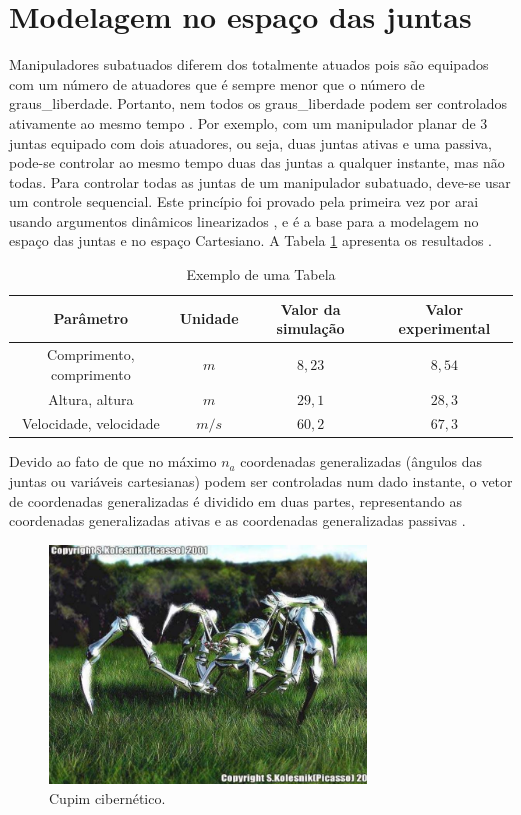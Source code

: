 \section{Modelagem no espaço das juntas}
Manipuladores subatuados diferem dos totalmente atuados pois são equipados com um número de atuadores que é sempre menor que o número de \gls{graus_liberdade}. Portanto, nem todos os \gls{graus_liberdade} podem ser controlados ativamente ao mesmo tempo \cite{Sbornian2004}. Por exemplo, com um manipulador planar de 3 juntas equipado com dois atuadores, ou seja, duas juntas ativas e
uma passiva, pode-se controlar ao mesmo tempo duas das juntas a qualquer instante, mas não todas. Para controlar todas as juntas de um manipulador subatuado, deve-se usar um controle sequencial. Este princípio foi provado pela primeira vez por {arai} usando  argumentos dinâmicos linearizados \cite{Joea2003}, e é a base para a modelagem no espaço das juntas e no espaço Cartesiano. A Tabela \ref{minhatab} apresenta os resultados \cite{Assenmacher1993,Silberschatz1991,Caromel1998}.

\begin{table}
\caption{Exemplo de uma Tabela}
\label{minhatab}

\center
\begin{tabular}{cccc}
  \hline
	Parâmetro & Unidade & Valor da simulação & Valor experimental   \\
	\hline
  Comprimento, \gls{comprimento} & $m$ &  $8,23$  & $8,54$ \\
  Altura, \gls{altura} & $m$     &  $29,1$ & $28,3$\\
	Velocidade, \gls{velocidade} & $m/s$  &  $60,2$ & $67,3$\\
	\hline
\end{tabular}
\end{table}

Devido ao fato de que no máximo $n_{a}$ coordenadas generalizadas (ângulos das juntas ou variáveis cartesianas) podem ser controladas num dado instante, o vetor de coordenadas generalizadas é dividido em duas partes, representando as coordenadas generalizadas ativas e as coordenadas generalizadas passivas \cite{Callaghan1995}.

\begin{figure}[ht]
\centering
\includegraphics[width=0.75\textwidth]{Cap2/spiderrobot}
\caption{Cupim cibernético.}\label{FDIII}
\end{figure}

